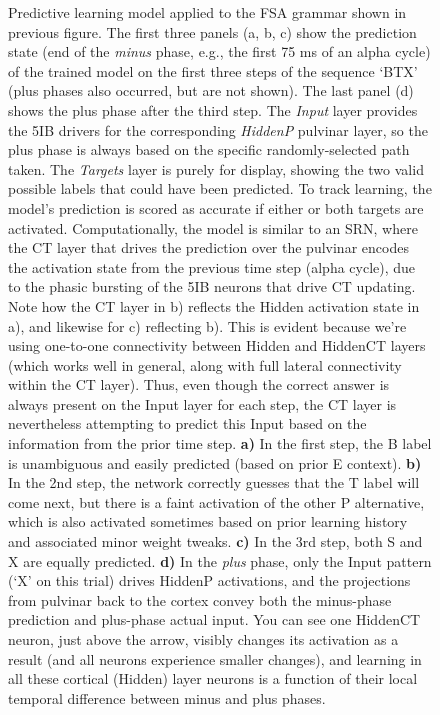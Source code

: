 \documentclass[11pt,twoside]{article}
\newif\myifpdf
\begin{document}
\begin{figure}
  \caption{\footnotesize Predictive learning model applied to the FSA grammar shown in previous figure. The first three panels (a, b, c) show the prediction state (end of the \emph{minus} phase, e.g., the first 75 ms of an alpha cycle) of the trained model on the first three steps of the sequence `BTX' (plus phases also occurred, but are not shown).  The last panel (d) shows the plus phase after the third step.  The \emph{Input} layer provides the 5IB drivers for the corresponding \emph{HiddenP} pulvinar layer, so the plus phase is always based on the specific randomly-selected path taken.  The \emph{Targets} layer is purely for display, showing the two valid possible labels that could have been predicted.  To track learning, the model's prediction is scored as accurate if either or both targets are activated.  Computationally, the model is similar to an SRN, where the CT layer that drives the prediction over the pulvinar encodes the activation state from the previous time step (alpha cycle), due to the phasic bursting of the 5IB neurons that drive CT updating.  Note how the CT layer in b) reflects the Hidden activation state in a), and likewise for c) reflecting b).  This is evident because we're using one-to-one connectivity between Hidden and HiddenCT layers (which works well in general, along with full lateral connectivity within the CT layer).  Thus, even though the correct answer is always present on the Input layer for each step, the CT layer is nevertheless attempting to predict this Input based on the information from the prior time step.  {\bf a)} In the first step, the B label is unambiguous and easily predicted (based on prior E context). {\bf b)} In the 2nd step, the network correctly guesses that the T label will come next, but there is a faint activation of the other P alternative, which is also activated sometimes based on prior learning history and associated minor weight tweaks.  {\bf c)} In the 3rd step, both S and X are equally predicted.  {\bf d)} In the \emph{plus} phase, only the Input pattern (`X' on this trial) drives HiddenP activations, and the projections from pulvinar back to the cortex convey both the minus-phase prediction and plus-phase actual input.  You can see one HiddenCT neuron, just above the arrow, visibly changes its activation as a result (and all neurons experience smaller changes), and learning in all these cortical (Hidden) layer neurons is a function of their local temporal difference between minus and plus phases.}
  \label{fig.fsa_net}
\end{figure}
\end{document}
